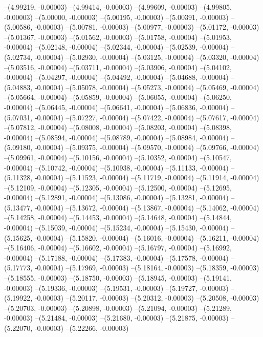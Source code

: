 --(4.99219, -0.00003)
--(4.99414, -0.00003)
--(4.99609, -0.00003)
--(4.99805, -0.00003)
--(5.00000, -0.00003)
--(5.00195, -0.00003)
--(5.00391, -0.00003)
--(5.00586, -0.00003)
--(5.00781, -0.00003)
--(5.00977, -0.00003)
--(5.01172, -0.00003)
--(5.01367, -0.00003)
--(5.01562, -0.00003)
--(5.01758, -0.00004)
--(5.01953, -0.00004)
--(5.02148, -0.00004)
--(5.02344, -0.00004)
--(5.02539, -0.00004)
--(5.02734, -0.00004)
--(5.02930, -0.00004)
--(5.03125, -0.00004)
--(5.03320, -0.00004)
--(5.03516, -0.00004)
--(5.03711, -0.00004)
--(5.03906, -0.00004)
--(5.04102, -0.00004)
--(5.04297, -0.00004)
--(5.04492, -0.00004)
--(5.04688, -0.00004)
--(5.04883, -0.00004)
--(5.05078, -0.00004)
--(5.05273, -0.00004)
--(5.05469, -0.00004)
--(5.05664, -0.00004)
--(5.05859, -0.00004)
--(5.06055, -0.00004)
--(5.06250, -0.00004)
--(5.06445, -0.00004)
--(5.06641, -0.00004)
--(5.06836, -0.00004)
--(5.07031, -0.00004)
--(5.07227, -0.00004)
--(5.07422, -0.00004)
--(5.07617, -0.00004)
--(5.07812, -0.00004)
--(5.08008, -0.00004)
--(5.08203, -0.00004)
--(5.08398, -0.00004)
--(5.08594, -0.00004)
--(5.08789, -0.00004)
--(5.08984, -0.00004)
--(5.09180, -0.00004)
--(5.09375, -0.00004)
--(5.09570, -0.00004)
--(5.09766, -0.00004)
--(5.09961, -0.00004)
--(5.10156, -0.00004)
--(5.10352, -0.00004)
--(5.10547, -0.00004)
--(5.10742, -0.00004)
--(5.10938, -0.00004)
--(5.11133, -0.00004)
--(5.11328, -0.00004)
--(5.11523, -0.00004)
--(5.11719, -0.00004)
--(5.11914, -0.00004)
--(5.12109, -0.00004)
--(5.12305, -0.00004)
--(5.12500, -0.00004)
--(5.12695, -0.00004)
--(5.12891, -0.00004)
--(5.13086, -0.00004)
--(5.13281, -0.00004)
--(5.13477, -0.00004)
--(5.13672, -0.00004)
--(5.13867, -0.00004)
--(5.14062, -0.00004)
--(5.14258, -0.00004)
--(5.14453, -0.00004)
--(5.14648, -0.00004)
--(5.14844, -0.00004)
--(5.15039, -0.00004)
--(5.15234, -0.00004)
--(5.15430, -0.00004)
--(5.15625, -0.00004)
--(5.15820, -0.00004)
--(5.16016, -0.00004)
--(5.16211, -0.00004)
--(5.16406, -0.00004)
--(5.16602, -0.00004)
--(5.16797, -0.00004)
--(5.16992, -0.00004)
--(5.17188, -0.00004)
--(5.17383, -0.00004)
--(5.17578, -0.00004)
--(5.17773, -0.00004)
--(5.17969, -0.00003)
--(5.18164, -0.00003)
--(5.18359, -0.00003)
--(5.18555, -0.00003)
--(5.18750, -0.00003)
--(5.18945, -0.00003)
--(5.19141, -0.00003)
--(5.19336, -0.00003)
--(5.19531, -0.00003)
--(5.19727, -0.00003)
--(5.19922, -0.00003)
--(5.20117, -0.00003)
--(5.20312, -0.00003)
--(5.20508, -0.00003)
--(5.20703, -0.00003)
--(5.20898, -0.00003)
--(5.21094, -0.00003)
--(5.21289, -0.00003)
--(5.21484, -0.00003)
--(5.21680, -0.00003)
--(5.21875, -0.00003)
--(5.22070, -0.00003)
--(5.22266, -0.00003)
